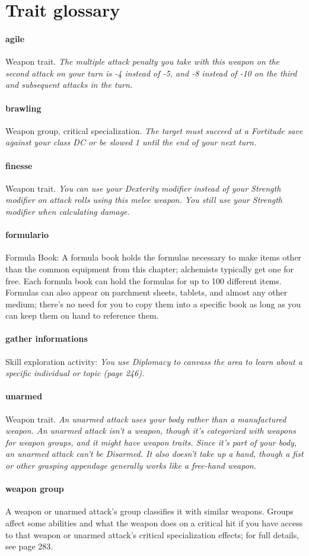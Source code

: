 \documentclass[
a4paper,
twoside,
11pt, 
openany,
]{memoir}
\begin{document}
\section*{Trait glossary}

\paragraph{agile} Weapon trait.
\emph{ The multiple attack penalty you take with this weapon on the second attack on your turn is -4 instead of -5, and -8 instead of -10 on the third and subsequent attacks in the turn.}

\paragraph{brawling} Weapon group, critical specialization.
\emph{The target must succeed at a Fortitude save against your class DC or be slowed 1 until the end of your next turn.}

\paragraph{finesse} Weapon trait.
\emph{You can use your Dexterity modifier instead of your Strength modifier on attack rolls using this melee weapon. You still use your Strength modifier when calculating damage.}

\paragraph{formulario} Formula Book: A formula book holds the formulas necessary to make items other than the common equipment from this chapter; alchemists typically get one for free. Each formula book can hold the formulas for up to 100 different items. Formulas can also appear on parchment sheets, tablets, and almost any other medium; there’s no need for you to copy them into a specific book as long as you can keep them on hand to reference them.

\paragraph{gather informations} Skill exploration activity: \emph{You use Diplomacy to canvass the area to learn about a specific individual or topic (page 246).}

\paragraph{unarmed} Weapon trait.
\emph{An unarmed attack uses your body rather than a manufactured weapon. An unarmed attack isn’t a weapon, though it’s categorized with weapons for weapon groups, and it might have weapon traits. Since it’s part of your body, an unarmed attack can’t be Disarmed. It also doesn’t take up a hand, though a fist or other grasping appendage generally works like a free-hand weapon.}

\paragraph{weapon group} A weapon or unarmed attack’s group classifies it with similar weapons. Groups affect some abilities and what the weapon does on a critical hit if you have access to that weapon or unarmed attack’s critical specialization effects; for full details, see page 283. 
\end{document}
